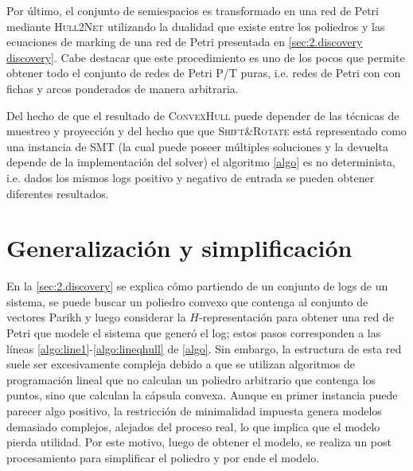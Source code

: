 Por último, el conjunto de semiespacios es transformado en una red de Petri mediante \textsc{Hull2Net} utilizando
la dualidad que existe entre los poliedros y las ecuaciones de marking de una red de Petri
presentada en \autoref{sec:2.discovery discovery}.
Cabe destacar que este procedimiento es uno de los pocos que permite obtener todo el conjunto de redes de Petri P/T puras,
i.e. redes de Petri con con fichas y arcos ponderados de manera arbitraria.

Del hecho de que el resultado de \textsc{ConvexHull} puede depender de las técnicas de muestreo y proyección y del
hecho que que \textsc{Shift\&Rotate} está representado como una instancia de SMT (la cual puede poseer múltiples soluciones
y la devuelta depende de la implementación del solver) el algoritmo \autoref{algo} es no determinista, i.e. dados
los mismos logs positivo y negativo de entrada se pueden obtener diferentes resultados.

    
\section{Generalización y simplificación}
\label{sec:3.gensimp}

En la \autoref{sec:2.discovery} se explica cómo partiendo de un conjunto de logs de un sistema, se puede
buscar un poliedro convexo que contenga al conjunto de vectores Parikh y luego considerar la $H$-representación para
obtener una red de Petri que modele el sistema que generó el log; estos pasos corresponden
a las líneas \ref{algo:line1}-\ref{algo:lineqhull} de \autoref{algo}.
Sin embargo, la estructura de esta red suele ser excesivamente compleja debido a que se utilizan 
algoritmos de programación lineal que no calculan un poliedro arbitrario que contenga los puntos,
sino que calculan la cápsula convexa. Aunque en primer instancia puede parecer algo positivo, la restricción
de minimalidad impuesta genera modelos demasiado complejos, alejados del proceso real, lo que
implica que el modelo pierda utilidad. Por este motivo, luego de obtener el modelo, se realiza un post
procesamiento para simplificar el poliedro y por ende el modelo.

